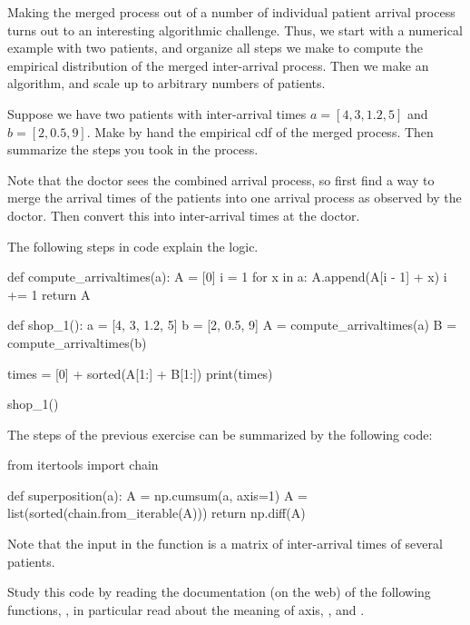 Making the merged process out of a number of individual patient arrival process turns out to an interesting algorithmic challenge.
Thus, we start with a numerical example with two patients, and organize all steps we make to compute the empirical distribution of the merged inter-arrival process.
Then we make an algorithm, and scale up to arbitrary numbers of patients.

\begin{exercise}
  Suppose we have two patients with inter-arrival times $a=[4, 3, 1.2, 5]$ and $b=[2, 0.5, 9]$.
  Make by hand the empirical cdf of the merged process.
  Then summarize the steps you took in the process.

\begin{hint}
Note that the doctor sees the combined arrival process, so first find a way to merge the arrival times of the patients into one arrival process as observed by the doctor. Then convert this into inter-arrival times at the doctor.
\end{hint}
\begin{solution}
    The following steps in code explain the logic.
    \begin{pyverbatim}
def compute_arrivaltimes(a):
    A = [0]
    i = 1
    for x in a:
        A.append(A[i - 1] + x)
        i += 1
    return A


def shop_1():
    a = [4, 3, 1.2, 5]
    b = [2, 0.5, 9]
    A = compute_arrivaltimes(a)
    B = compute_arrivaltimes(b)

    times = [0] + sorted(A[1:] + B[1:])
    print(times)


shop_1()
    \end{pyverbatim}
  \end{solution}
\end{exercise}


\begin{exercise}
The steps of the previous exercise can be summarized by the following code:
\begin{pyverbatim}
from itertools import chain


def superposition(a):
    A = np.cumsum(a, axis=1)
    A = list(sorted(chain.from_iterable(A)))
    return np.diff(A)
\end{pyverbatim}
Note that the input  in the function  is a matrix of inter-arrival times of several patients.

Study this code by reading the documentation (on the web) of the following functions, , in particular read about the meaning of axis, , and .

\end{exercise}


